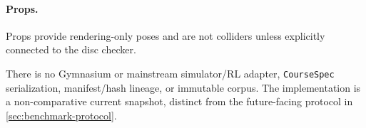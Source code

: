 \paragraph{Props.}
Props provide rendering-only poses and are not colliders unless explicitly connected
to the disc checker.

There is no Gymnasium or mainstream simulator/RL adapter, \texttt{CourseSpec}
serialization, manifest/hash lineage, or immutable corpus. The implementation is a
non-comparative current snapshot, distinct from the future-facing protocol in
\cref{sec:benchmark-protocol}.
